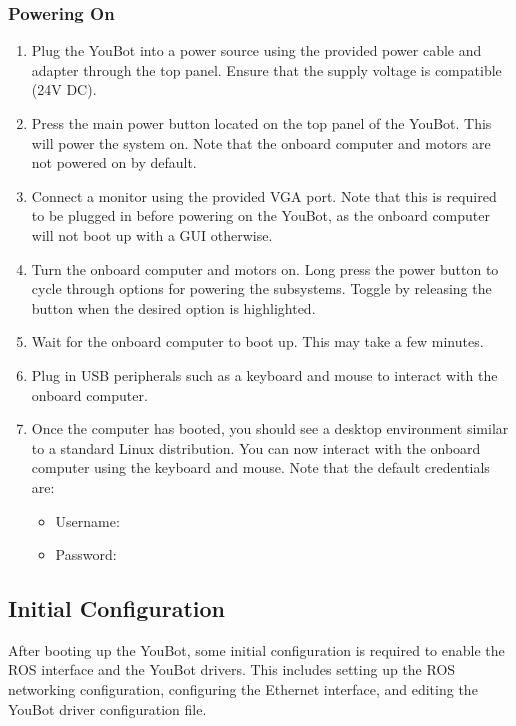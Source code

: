 \documentclass[a4paper, 12pt]{article}
\newif\ifshownotes
\newcommand{\notes}[1]{\ifshownotes\textcolor{blue}{#1}\fi}
\newcommand{\code}[1]{\texttt{\detokenize{#1}}}
\begin{document}
    \subsubsection{Powering On}
    \begin{enumerate}[topsep=0pt, noitemsep]
        \item Plug the YouBot into a power source using the provided power cable and adapter through the top panel. Ensure that the supply voltage is compatible (24V DC).
        \item Press the main power button located on the top panel of the YouBot. This will power the system on. Note that the onboard computer and motors are not powered on by default. 
        \item Connect a monitor using the provided VGA port. Note that this is required to be plugged in before powering on the YouBot, as the onboard computer will not boot up with a GUI otherwise. 
        \item Turn the onboard computer and motors on. Long press the power button to cycle through options for powering the subsystems. Toggle by releasing the button when the desired option is highlighted. 
        \item Wait for the onboard computer to boot up. This may take a few minutes. 
        \item Plug in USB peripherals such as a keyboard and mouse to interact with the onboard computer.
        \item Once the computer has booted, you should see a desktop environment similar to a standard Linux distribution. You can now interact with the onboard computer using the keyboard and mouse. Note that the default credentials are: 
        \begin{itemize}[topsep=0pt, noitemsep]
            \item Username: \code{youbot}
            \item Password: \code{youbot}
        \end{itemize}
    \end{enumerate}

    \notes{add image of the booting up process.}

    \subsection{Initial Configuration}

    After booting up the YouBot, some initial configuration is required to enable the ROS interface and the YouBot drivers. This includes setting up the ROS networking configuration, configuring the Ethernet interface, and editing the YouBot driver configuration file. 
\end{document}
